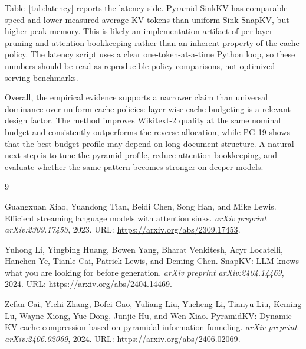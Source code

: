 \documentclass{article}
\begin{document}
Table~\ref{tab:latency} reports the latency side. Pyramid SinkKV has comparable
speed and lower measured average KV tokens than uniform Sink-SnapKV, but higher
peak memory. This is likely an implementation artifact of per-layer pruning and
attention bookkeeping rather than an inherent property of the cache policy. The
latency script uses a clear one-token-at-a-time Python loop, so these numbers
should be read as reproducible policy comparisons, not optimized serving
benchmarks.

Overall, the empirical evidence supports a narrower claim than universal
dominance over uniform cache policies: layer-wise cache budgeting is a relevant
design factor. The method improves Wikitext-2 quality at the same nominal budget
and consistently outperforms the reverse allocation, while PG-19 shows that the
best budget profile may depend on long-document structure. A natural next step
is to tune the pyramid profile, reduce attention bookkeeping, and evaluate
whether the same pattern becomes stronger on deeper models.

\begin{thebibliography}{9}

Guangxuan Xiao, Yuandong Tian, Beidi Chen, Song Han, and Mike Lewis.
\newblock Efficient streaming language models with attention sinks.
\newblock \emph{arXiv preprint arXiv:2309.17453}, 2023.
\newblock URL: \url{https://arxiv.org/abs/2309.17453}.

Yuhong Li, Yingbing Huang, Bowen Yang, Bharat Venkitesh, Acyr Locatelli,
Hanchen Ye, Tianle Cai, Patrick Lewis, and Deming Chen.
\newblock SnapKV: LLM knows what you are looking for before generation.
\newblock \emph{arXiv preprint arXiv:2404.14469}, 2024.
\newblock URL: \url{https://arxiv.org/abs/2404.14469}.

Zefan Cai, Yichi Zhang, Bofei Gao, Yuliang Liu, Yucheng Li, Tianyu Liu, Keming
Lu, Wayne Xiong, Yue Dong, Junjie Hu, and Wen Xiao.
\newblock PyramidKV: Dynamic KV cache compression based on pyramidal
information funneling.
\newblock \emph{arXiv preprint arXiv:2406.02069}, 2024.
\newblock URL: \url{https://arxiv.org/abs/2406.02069}.

\end{thebibliography}
\end{document}
